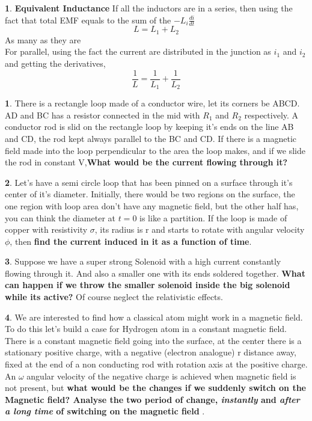\documentclass[10pt,letterpaper,twocolumn]{article}
\theoremstyle{definition}
\newtheorem{fct}{\framebox[0.07\textwidth]{{\sffamily Fact}}}[section]
\theoremstyle{definition}
\newtheorem{pr}{\framebox[0.07\textwidth]{Pr}}[section]
\theoremstyle{definition}
\begin{document}
\begin{fct} \textbf{Equivalent Inductance}
If all the inductors are in a series, then using the fact that total EMF equals to the sum of the $-L_i \frac{di}{dt}$ 
\[ L = L_1 + L_2 \]
As many as they are\\
For parallel, using the fact the current are distributed in the junction as $i_1$ and $i_2$ and getting the derivatives,
\[ \frac{1}{L} = \frac{1}{L_1} + \frac{1}{L_2} \]
\end{fct}
\begin{pr}
There is a rectangle loop made of a conductor wire, let its corners be ABCD. AD and BC has a resistor connected in the mid with $R_1$ and $R_2$ respectively. A conductor rod is slid on the rectangle loop by keeping it's ends on the line AB and CD, the rod kept always parallel to the BC and CD. If there is a magnetic field made into the loop perpendicular to the area the loop makes, and if we slide the rod in constant V,\textbf{What would be the current flowing through it?}
\end{pr}
\begin{pr}
Let's have a semi circle loop that has been pinned on a surface through it's center of it's diameter. Initially, there would be two regions on the surface, the one region with loop area don't have any magnetic field, but the other half has, you can think the diameter at $t=0$ is like a partition. If the loop is made of copper with resistivity $\sigma$, its radius is r and starts to rotate with angular velocity $\phi$, then \textbf{find the current induced in it as a function of time}.
\end{pr}
\begin{pr}
Suppose we have a super strong Solenoid with a high current constantly flowing through it. And also a smaller one with its ends soldered together. \textbf{What can happen if we throw the smaller solenoid inside the big solenoid while its active?} Of course neglect the relativistic effects.
\end{pr}
\begin{pr}
We are interested to find how a classical atom might work in a magnetic field. To do this let's build a case for Hydrogen atom in a constant magnetic field. \\
There is a constant magnetic field going into the surface, at the center there is a stationary positive charge, with a negative (electron analogue) r distance away, fixed at the end of a non conducting rod with rotation axis at the positive charge. An $\omega$ angular velocity of the negative charge is achieved when magnetic field is not present, but \textbf{what would be the changes if we suddenly switch on the Magnetic field? Analyse the two period of change, \textit{instantly} and \textit{after a long time} of switching on the magnetic field }.

\end{pr}
\end{document}
